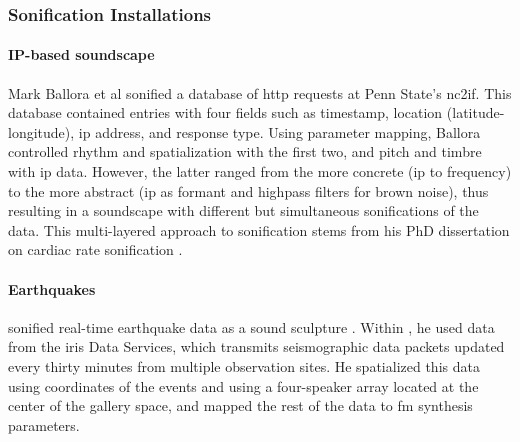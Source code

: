 \subsubsection{Sonification Installations}
\label{sonification:installations}

% 
% 

\paragraph{IP-based soundscape}
Mark Ballora et al \parencite{icmc/bbp2372.2010.117} sonified a database of \gls{http} requests at Penn State's \gls{nc2if}. This database contained entries with four fields such as timestamp, location (latitude-longitude), \gls{ip} address, and response type. Using parameter mapping, Ballora controlled rhythm and spatialization with the first two, and pitch and timbre with \gls{ip} data. However, the latter ranged from the more concrete (\gls{ip} to frequency) to the more abstract (\gls{ip} as formant and highpass filters for brown noise), thus resulting in a soundscape with different but simultaneous sonifications of the data. This multi-layered approach to sonification stems from his PhD dissertation on cardiac rate sonification \parencite{Ballora/2000/phdthesis}.

\paragraph{Earthquakes}
\citeauthor{icmc/bbp2372.2017.033} sonified real-time earthquake data as a sound sculpture \parencite{icmc/bbp2372.2017.033}. Within , he used data from the \gls{iris} Data Services, which transmits seismographic data packets updated every thirty minutes from multiple observation sites. He spatialized this data using coordinates of the events and using a four-speaker array located at the center of the gallery space, and mapped the rest of the data to \gls{fm} synthesis parameters.

